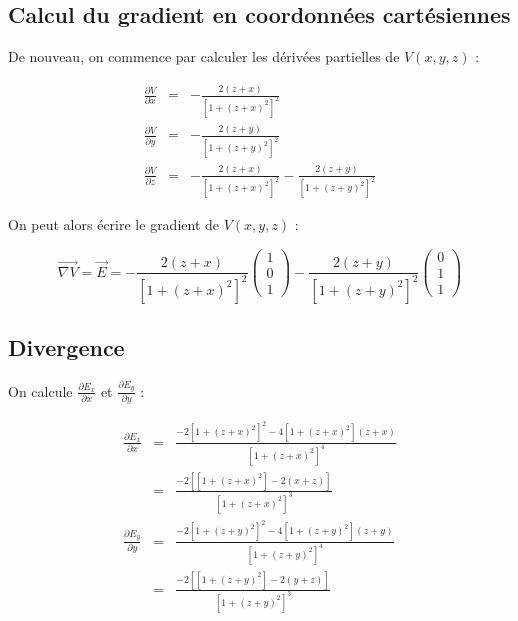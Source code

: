 \documentclass[a4paper, 11pt]{report} %
\newcommand{\vect}{\overrightarrow}
\begin{document}
\subsection{Calcul du gradient en coordonnées cartésiennes}

De nouveau, on commence par calculer les dérivées partielles de $V(x,y,z)$ :

\begin{eqnarray*}
    \frac{\partial V}{\partial x} & = & -\frac{2(z+x)}{\left[1+(z+x)^2\right]^2}\\
    \frac{\partial V}{\partial y} & = & -\frac{2(z+y)}{\left[1+(z+y)^2\right]^2}\\
    \frac{\partial V}{\partial z} & = & -\frac{2(z+x)}{\left[1+(z+x)^2\right]^2} - \frac{2(z+y)}{\left[1+(z+y)^2\right]^2}
\end{eqnarray*}


On peut alors écrire le gradient de $V(x,y,z)$ :

$$\vect{\nabla V} = \vect{E} = -\frac{2(z+x)}{\left[1+(z+x)^2\right]^2}
\begin{pmatrix}
    1\\
    0\\
    1
\end{pmatrix}
- \frac{2(z+y)}{\left[1+(z+y)^2\right]^2}
\begin{pmatrix}
    0\\
    1\\
    1
\end{pmatrix}
$$

\subsection{Divergence}

On calcule $\frac{\partial E_x}{\partial x}$ et $\frac{\partial E_y}{\partial y}$ :

\begin{eqnarray*}
    \frac{\partial E_x}{\partial x} & = & \frac{-2\left[1+(z+x)^2\right]^2 - 4\left[1+(z+x)^2\right](z+x)}{\left[1+(z+x)^2\right]^4}\\
                                    & = & \frac{-2\left[\left[1+(z+x)^2\right]-2(x+z)\right]}{\left[1+(z+x)^2\right]^3}\\
    \frac{\partial E_y}{\partial y} & = & \frac{-2\left[1+(z+y)^2\right]^2 - 4\left[1+(z+y)^2\right](z+y)}{\left[1+(z+y)^2\right]^4}\\
                                    & = & \frac{-2\left[\left[1+(z+y)^2\right]-2(y+z)\right]}{\left[1+(z+y)^2\right]^3}
\end{eqnarray*}
\end{document}
